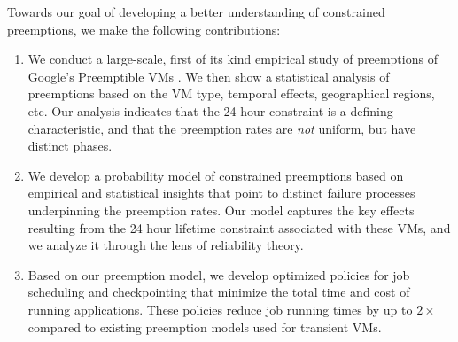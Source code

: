 Towards our goal of developing a better understanding of constrained preemptions, we make the following contributions:
\begin{enumerate} [leftmargin=12pt]

\item We conduct a large-scale, first of its kind empirical study of preemptions of Google's Preemptible VMs \footnotemark. We then show a statistical analysis of preemptions based on the VM type, temporal effects, geographical regions, etc. Our analysis 
  indicates that the 24-hour constraint is a defining characteristic, and that the preemption rates are \emph{not} uniform, but have distinct phases. 

\item We develop a probability model of constrained preemptions based on empirical and statistical insights that point to distinct failure processes underpinning the preemption rates. Our model captures the key effects resulting from the 24 hour lifetime constraint associated with these VMs, and we analyze it through the lens of reliability theory.


\item Based on our preemption model, we develop optimized policies for job scheduling and checkpointing that minimize the total time and cost of running applications. These policies reduce job running times by up to $2\times$ compared to existing preemption models used for transient VMs. 
  


\end{enumerate}
